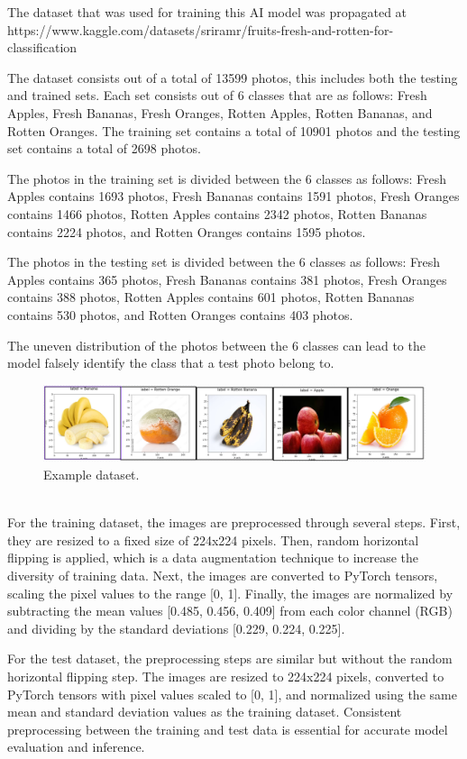 \documentclass[conference]{IEEEtran}
\begin{document}
The dataset that was used for training this AI model was propagated at https://www.kaggle.com/datasets/sriramr/fruits-fresh-and-rotten-for-classification

The dataset consists out of a total of 13599 photos, this includes both the testing and trained sets. Each set consists out of 6 classes that are as follows: Fresh Apples, Fresh Bananas, Fresh Oranges, Rotten Apples, Rotten Bananas, and Rotten Oranges. The training set contains a total of 10901 photos and the testing set contains a total of 2698 photos.

The photos in the training set is divided between the 6 classes as follows: Fresh Apples contains 1693 photos, Fresh Bananas contains 1591 photos, Fresh Oranges contains 1466 photos, Rotten Apples contains 2342 photos, Rotten Bananas contains 2224 photos, and Rotten Oranges contains 1595 photos.

The photos in the testing set is divided between the 6 classes as follows: Fresh Apples contains 365 photos, Fresh Bananas contains 381 photos, Fresh Oranges contains 388 photos, Rotten Apples contains 601 photos, Rotten Bananas contains 530 photos, and Rotten Oranges contains 403 photos.

The uneven distribution of the photos between the 6 classes can lead to the model falsely identify the class that a test photo belong to.
\begin{figure}[h]
    \centering
    \includegraphics[width=\linewidth]{Example data.png}
    \caption{Example dataset.}
    \label{fig}
\end{figure}
\\
For the training dataset, the images are preprocessed through several steps. First, they are resized to a fixed size of 224x224 pixels. Then, random horizontal flipping is applied, which is a data augmentation technique to increase the diversity of training data. Next, the images are converted to PyTorch tensors, scaling the pixel values to the range [0, 1]. Finally, the images are normalized by subtracting the mean values [0.485, 0.456, 0.409] from each color channel (RGB) and dividing by the standard deviations [0.229, 0.224, 0.225].

For the test dataset, the preprocessing steps are similar but without the random horizontal flipping step. The images are resized to 224x224 pixels, converted to PyTorch tensors with pixel values scaled to [0, 1], and normalized using the same mean and standard deviation values as the training dataset. Consistent preprocessing between the training and test data is essential for accurate model evaluation and inference.
\end{document}
